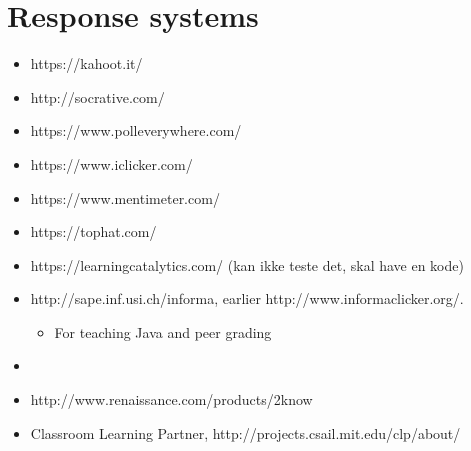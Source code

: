 \section{Response systems}
\begin{itemize}
    \item https://kahoot.it/
    \item http://socrative.com/
    \item https://www.polleverywhere.com/
    \item https://www.iclicker.com/
    \item https://www.mentimeter.com/
    \item https://tophat.com/
    \item https://learningcatalytics.com/ (kan ikke teste det, skal have en kode)
    \item http://sape.inf.usi.ch/informa, earlier http://www.informaclicker.org/.
        \begin{itemize}
            \item For teaching Java and peer grading
        \end{itemize}
    \item 
    \item http://www.renaissance.com/products/2know
    \item Classroom Learning Partner, http://projects.csail.mit.edu/clp/about/
\end{itemize}

